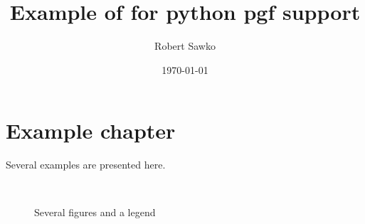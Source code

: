 \documentclass{report}
\date{\today}
\author{Robert Sawko}
\affil{Department of Engineering Computing, Cranfield University}
\title{Example of for python pgf support}
\begin{document}
\chapter{Example chapter}

Several examples are presented here.

\begin{figure}[b] 
  \centering
   
   
   
  \\
   
  \caption{Several figures and a legend}
  \label{fig:problem} 
\end{figure}
\end{document}
